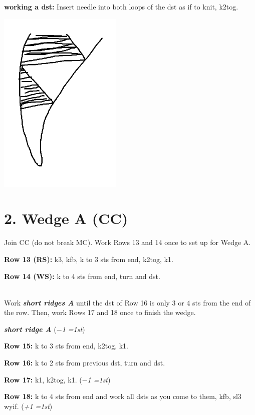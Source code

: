 \documentclass[12pt]{article}
\newcommand{\vocab}[1]{\emph{\textbf{#1}}} %
\newcommand{\rowDir}[1]{\textbf{#1:}} %
\newcommand{\wiggle}[1]{\colorbox{wiggle}{#1}} %
\newcommand{\increase}[1]{(\emph{+#1 
	\ifnum#1=1{st}\else{sts}\fi})}
\newcommand{\decrease}[1]{(\emph{$-$#1
	\ifnum#1=1{st}\else{sts}\fi})}
\newenvironment{frnote}
    {%
    	\def\FrameCommand{\fboxrule=\FrameRule\fboxsep=\FrameSep \fcolorbox{framecolor}{shadecolor}}
    	\MakeFramed {\advance\hsize-\width\FrameRestore}}
    {\endMakeFramed}
\begin{document}
\begin{multicols}{2}
\begin{frnote}
\rowDir{working a dst}
Insert needle into both loops of the dst as if to knit, k2tog.
\end{frnote}
\vfill ~\\
\columnbreak

\hfill\includegraphics[height=3.5in]{detail_PH}
\vfill

\section*{2. Wedge A (CC)}

Join CC (do not break MC). Work Rows 13 and 14 once to set up for Wedge A.

\rowDir{Row 13 (RS)} k3, kfb, k to 3 sts from end, k2tog, k1.

\rowDir{Row 14 (WS)} k to 4 sts from end, turn and dst.

~\\
Work \vocab{short ridges A} until the dst of Row 16 is only 3 \wiggle{or 4} sts from the end of the row. Then, work Rows 17 and 18 once to finish the wedge.

\begin{framed}
\vocab{short ridge A} \decrease{1}\vspace{0.5em}

\rowDir{Row 15} k to 3 sts from end, k2tog, k1.

\rowDir{Row 16} k to 2 sts from previous dst, turn and dst.
\end{framed}

\rowDir{Row 17} \wiggle{k1,} k2tog, k1. \decrease{1}

\rowDir{Row 18} k to 4 sts from end and work all dsts as you come to them, kfb, sl3 wyif. \increase{1}


\end{multicols}
\end{document}
